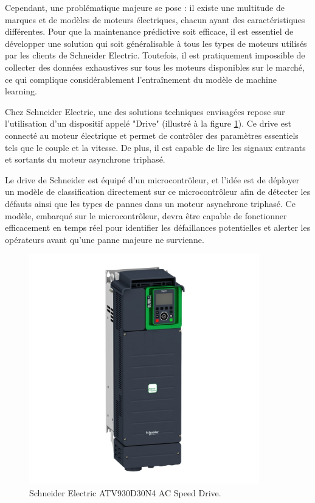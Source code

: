 Cependant, une problématique majeure se pose : il existe une multitude de
marques et de modèles de moteurs électriques, chacun ayant des caractéristiques
différentes. Pour que la maintenance prédictive soit efficace, il est essentiel
de développer une solution qui soit généralisable à tous les types de moteurs
utilisés par les clients de Schneider Electric. Toutefois, il est pratiquement
impossible de collecter des données exhaustives sur tous les moteurs
disponibles sur le marché, ce qui complique considérablement l'entraînement du
modèle de machine learning.

Chez Schneider Electric, une des solutions techniques envisagées repose sur
l'utilisation d'un dispositif appelé "Drive" (illustré à la figure
\ref{fig:drive}). Ce drive est connecté au moteur électrique et permet de
contrôler des paramètres essentiels tels que le couple et la vitesse. De plus,
il est capable de lire les signaux entrants et sortants du moteur asynchrone
triphasé.

Le drive de Schneider est équipé d'un microcontrôleur, et l'idée est de
déployer un modèle de classification directement sur ce microcontrôleur afin de
détecter les défauts ainsi que les types de pannes dans un moteur asynchrone
triphasé. Ce modèle, embarqué sur le microcontrôleur, devra être capable de
fonctionner efficacement en temps réel pour identifier les défaillances
potentielles et alerter les opérateurs avant qu'une panne majeure ne survienne.

\begin{figure}[hbt!]
  \centering
  \includegraphics[width=10cm]{images_pfe/drive_se.jpg}
  \caption{Schneider Electric ATV930D30N4 AC Speed Drive.}
  \label{fig:drive}
\end{figure}
\FloatBarrier

